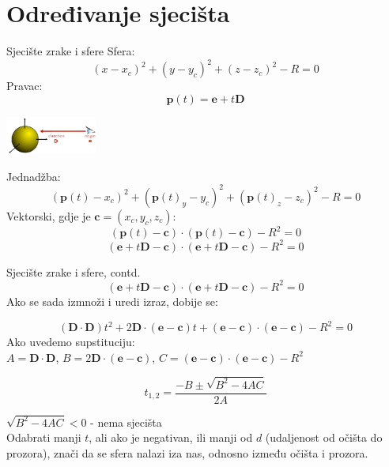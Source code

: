 \documentclass[9pt]{beamer}
\begin{document}
\section{Određivanje sjecišta}
\begin{frame}{Sjecište zrake i sfere}
Sfera:
$$(x-x_c)^2 + (y-y_c)^2 + (z-z_c)^2 - R = 0$$
Pravac:
$$\textbf{p}(t) = \textbf{e}+t\textbf{D}$$
\begin{center}
	\includegraphics[width=3cm]{slike/ray_sfera.png}
\end{center}

Jednadžba:
$$(\textbf{p}(t)-x_c)^2 + (\textbf{p}(t)_y-y_c)^2 + (\textbf{p}(t)_z-z_c)^2 - R = 0$$
Vektorski, gdje je $\textbf{c}=(x_c, y_c, z_c)$:
$$(\textbf{p}(t)-\textbf{c})\cdot (\textbf{p}(t)-\textbf{c}) - R^2 = 0$$
$$(\textbf{e} + t\textbf{D}-\textbf{c})\cdot (\textbf{e} + t\textbf{D}-\textbf{c}) - R^2 = 0$$
\end{frame}	

\begin{frame}{Sjecište zrake i sfere, contd.}
$$(\textbf{e} + t\textbf{D}-\textbf{c})\cdot (\textbf{e} + t\textbf{D}-\textbf{c}) - R^2 = 0$$
Ako se sada izmnoži i uredi izraz, dobije se:

$$(\textbf{D}\cdot \textbf{D})t^2+2\textbf{D}\cdot(\textbf{e}-\textbf{c})t + (\textbf{e}-\textbf{c})\cdot(\textbf{e}-\textbf{c}) - R^2=0$$
Ako uvedemo supstituciju:\\
$A = \textbf{D}\cdot \textbf{D}$, $B = 2\textbf{D}\cdot(\textbf{e}-\textbf{c})$, $C = (\textbf{e}-\textbf{c})\cdot(\textbf{e}-\textbf{c}) - R^2$

$$t_{1,2} = \frac{-B \pm \sqrt{B^2-4AC}}{2A}$$

$\sqrt{B^2-4AC} < 0$ - nema sjecišta \\
Odabrati manji $t$, ali ako je negativan, ili manji od $d$ (udaljenost od očišta do prozora), znači da se sfera nalazi iza nas, odnosno između očišta i prozora.
\end{frame}	
\end{document}
